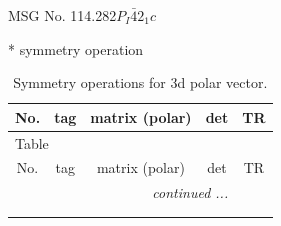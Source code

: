\documentclass[fleqn,8pt]{jsarticle}
\begin{document}
\setcounter{MaxMatrixCols}{32}

\renewcommand{\tablename}{Table~}
\renewcommand{\figurename}{Figure~}
\begin{center}
\LARGE
MSG No. 114.282\quad$P_{I}\bar{4}2_{1}c$
\end{center}
* symmetry operation
\renewcommand{\arraystretch}{1.3}
\begin{longtable}{ccccc}
\caption{Symmetry operations for 3d polar vector.}
 \\
 \hline \hline
No. & tag & matrix (polar) & det & TR \\ \hline \endfirsthead

\multicolumn{4}{l}{\tablename\ \thetable{}} \\
 \hline \hline
No. & tag & matrix (polar) & det & TR \\ \hline \endhead

 \hline \hline
\multicolumn{4}{r}{\footnotesize\it continued ...} \\ \endfoot

 \hline \hline
\multicolumn{4}{r}{} \\ \endlastfoot


\end{longtable}
\end{document}
